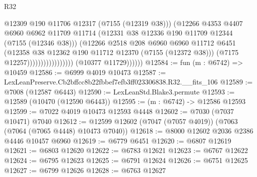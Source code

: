 \begin{lexlean}{R32}
\begin{coremodule}
                                            @12309
                                            @190
                                            @11706
                                            @12317
                                            (@7155 (@12319 @38)))
                                          (@12266
                                            @4353
                                            @4407
                                            @6960
                                            @6962
                                            @11709
                                            @11714
                                            (@12331
                                              @38
                                              @12336
                                              @190
                                              @11709
                                              @12344
                                              (@7155 (@12346 @38)))
                                            (@12266
                                              @2518
                                              @208
                                              @6960
                                              @6960
                                              @11712
                                              @6451
                                              (@12358
                                                @38
                                                @12362
                                                @190
                                                @11712
                                                @12370
                                                (@7155 (@12372 @38)))
                                              (@7175 @12257)))))))))))))))))
              (@10377 @11729))))))
@12584 := fun (m : @6742) => @10459
@12586 := @6999 @4019 @10473
@12587 := LexLeanPreserve.Cb2bffcc8b22fbbef7efb3ff023306838.R32.__fits_106
@12589 := @7008 (@12587 @6443)
@12590 := LexLeanStd.Blake3.permute
@12593 := @12589 (@10470 (@12590 @6443))
@12595 := (m : @6742) -> @12586 @12593
@12599 := @7022 @4019 @10473 @12593 @4448
@12602 := @7030 (@7037 @10471) @7040
@12612 := @12599 @12602 (@7047 (@7057 @4019)) (@7063 (@7064 (@7065 @4448) @10473 @7040))
@12618 := @8000 @12602 @2036 @2386 @4446 @10457 @6960
@12619 := @6779 @6451
@12620 := @6807 @12619
@12621 := @6803 @12620
@12622 := @6783 @12621
@12623 := @6767 @12622
@12624 := @6795 @12623
@12625 := @6791 @12624
@12626 := @6751 @12625
@12627 := @6799 @12626
@12628 := @6763 @12627

\end{coremodule}
\end{lexlean}
